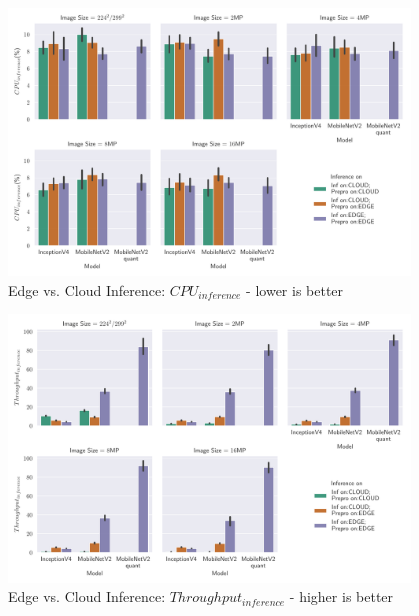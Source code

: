 \begin{figure}[!htb]
\centering
\includegraphics[width=0.95\textwidth]{./Bilder/single_plots/edge_vs_cloud_plots/Edge_vs_Cloud_Inference_Inference_CPU.pdf}
\caption[Edge vs. Cloud Inference:  $CPU_{inference}$ - lower is better]{Edge vs. Cloud Inference:  $CPU_{inference}$ - lower is better}
\label{fig:EdgeVsCloudInferenceCPU}
\end{figure}


\begin{figure}[!htb]
\centering
\includegraphics[width=0.95\textwidth]{./Bilder/single_plots/edge_vs_cloud_plots/Edge_vs_Cloud_Inference_Throughput_without_Preprocessing.pdf}
\caption{Edge vs. Cloud Inference:  $Throughput_{inference}$ - higher is better}
\label{fig:EdgeVsCloudinferneceThroughput}
\end{figure}

